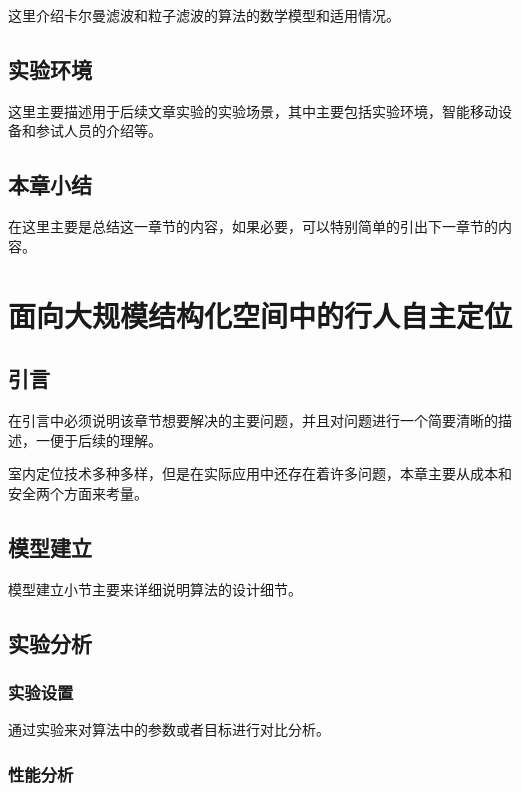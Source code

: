 这里介绍卡尔曼滤波和粒子滤波的算法的数学模型和适用情况。

\section{实验环境}

这里主要描述用于后续文章实验的实验场景，其中主要包括实验环境，智能移动设备和参试人员的介绍等。

\section{本章小结}

在这里主要是总结这一章节的内容，如果必要，可以特别简单的引出下一章节的内容。




\chapter{面向大规模结构化空间中的行人自主定位}

\section{引言}

在引言中必须说明该章节想要解决的主要问题，并且对问题进行一个简要清晰的描述，一便于后续的理解。

室内定位技术多种多样，但是在实际应用中还存在着许多问题，本章主要从成本和安全两个方面来考量。

\section{模型建立}

模型建立小节主要来详细说明算法的设计细节。

\section{实验分析}

\subsection{实验设置}
通过实验来对算法中的参数或者目标进行对比分析。
\subsection{性能分析}

